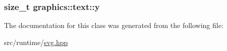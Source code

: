 \subsubsection[{\texorpdfstring{y}{y}}]{\setlength{\rightskip}{0pt plus 5cm}size\+\_\+t graphics\+::text\+::y\hspace{0.3cm}{\ttfamily [private]}}\hypertarget{classgraphics_1_1text_adc8e738ee02fd453e16f4babf3e5dfaf}{}\label{classgraphics_1_1text_adc8e738ee02fd453e16f4babf3e5dfaf}


The documentation for this class was generated from the following file\+:\begin{DoxyCompactItemize}
\item 
src/runtime/\hyperlink{svg_8hpp}{svg.\+hpp}\end{DoxyCompactItemize}
